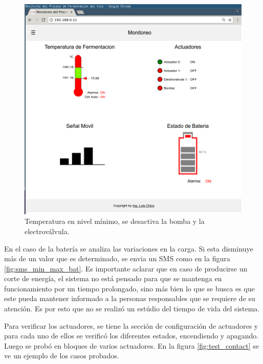 \begin{figure}[h]
  \centering
  \includegraphics[scale=.3]{./Figures/auto_control_inactive.png}
  \caption{Temperatura en nivel mínimo, se desactiva la bomba y la electroválvula.}
  \label{fig:auto_control_inactive}
\end{figure}


En el caso de la batería se analiza las variaciones en la carga.
Si esta disminuye más de un valor que es determinado, se envia un SMS como en la figura \ref{fig:sms_min_max_bat}. 
Es importante aclarar que en caso de producirse un corte de energía, el sistema no está pensado para que se mantenga en funcionamiento por un tiempo prolongado, sino más bien lo que se busca es que este pueda mantener informado a la personas responsables que se requiere de su atención. 
Es por esto que no se realizó un estúdio del tiempo de vida del sistema.

Para verificar los actuadores, se tiene la sección de configuración de actuadores y para cada uno de ellos se verificó los diferentes estados, encendiendo y apagando. Luego se probó en bloques de varios actuadores. En la figura \ref{fig:test_contact} se ve un ejemplo de los casos probados.

